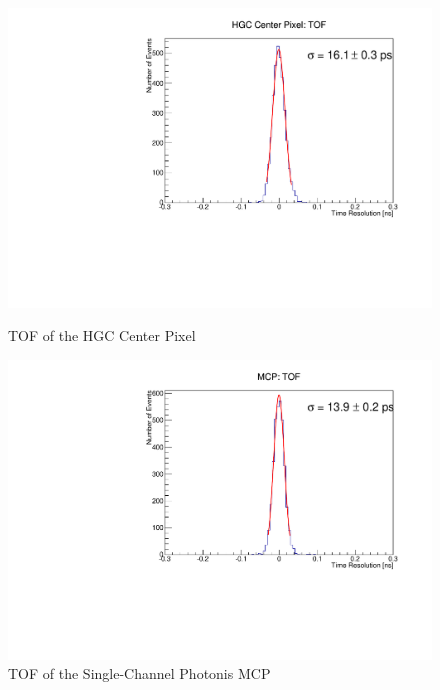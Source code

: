 \documentclass[12pt]{article}
\begin{document}
\begin{figure}
\centering
\begin{minipage}[t]{.49\textwidth}
	\centering
	\includegraphics[width=\textwidth]{deltaTCenter.pdf}
	\caption{TOF of the HGC Center Pixel}
	\label{fig:Center}
\end{minipage} \hfill
\begin{minipage}[t]{.49\textwidth}
	\centering
	\includegraphics[width=\textwidth]{deltaTMCP.pdf}
	\caption{TOF of the Single-Channel Photonis MCP}
	\label{fig:MCP}
\end{minipage}
\end{figure}
\end{document}
